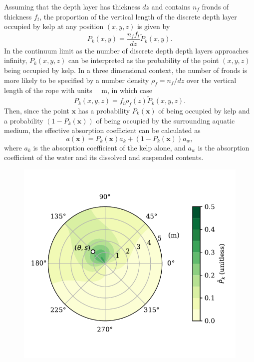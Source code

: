\documentclass[ms,cpyr,lof,lot]{uathesis}
\renewcommand\vec\bm
\begin{document}
Assuming that the depth layer has thickness $dz$ and contains $n_f$ fronds of thickness $f_t$,
the proportion of the vertical length of the discrete depth layer occupied by kelp at any position $(x,y,z)$ is given by
\begin{equation}
  P_k(x, y) = \frac{n_ff_t}{dz}\tilde{P}_k(x, y).
  \label{eqn:kelp_pk}
\end{equation}
In the continuum limit as the number of discrete depth depth layers approaches infinity, $P_k(x,y,z)$ can be interpreted as the probability of the point $(x,y,z)$ being occupied by kelp.
In a three dimensional context, the number of fronds is more likely to be specified by a number density $\rho_f=n_f/dz$ over the vertical length of the rope with units \SI{}{\per\m}, in which case
\begin{equation}
  P_k(x, y, z) = f_t \rho_f(z) \tilde{P}_k(x, y, z).
\end{equation}
Then, since the point $\vec{x}$ has a probability $P_k(\vec{x})$ of being occupied by kelp and a probability $(1-P_k(\vec{x}))$ of being occupied by the surrounding aquatic medium,
the effective absorption coefficient can be calculated as
\begin{equation*}
  \label{eqn:abs_field}
  a(\vec{x}) = P_k(\vec{x})a_k + (1-P_k(\vec{x}))a_w,
\end{equation*}
where $a_k$ is the absorption coefficient of the kelp alone, and $a_w$ is the absorption coefficient of the water and its dissolved and suspended contents.

\begin{figure}[h]
	\centering
	\includegraphics[width=4.5in]{prob_shade}
	\label{fig:prob_shade}
\end{figure}
\end{document}
